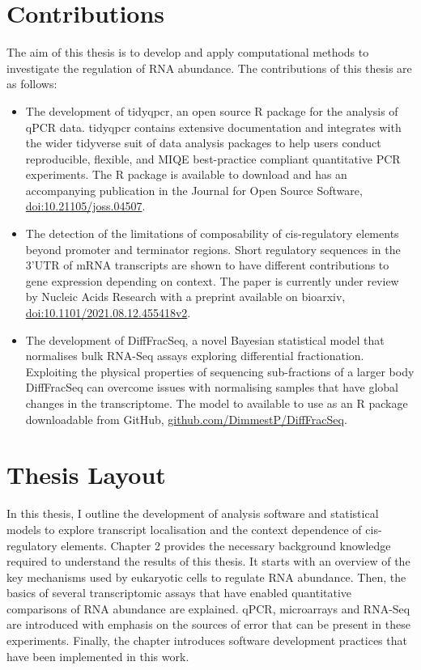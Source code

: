 \documentclass[../main.tex]{subfiles}
\begin{document}
\section{Contributions}
The aim of this thesis is to develop and apply computational methods to investigate the regulation of RNA abundance.
The contributions of this thesis are as follows:

\begin{itemize}
    \item The development of tidyqpcr, an open source R package for the analysis of qPCR data. 
    tidyqpcr contains extensive documentation and integrates with the wider tidyverse suit of data analysis packages to help users conduct reproducible, flexible, and MIQE best-practice compliant quantitative PCR experiments.
    The R package is available to download and has an accompanying publication in the Journal for Open Source Software, \href{https://joss.theoj.org/papers/10.21105/joss.04507}{doi:10.21105/joss.04507}.
    \item  The detection of the limitations of composability of cis-regulatory elements beyond promoter and terminator regions.
    Short regulatory sequences in the 3'UTR of mRNA transcripts are shown to have different contributions to gene expression depending on context.
    The paper is currently under review by Nucleic Acids Research with a preprint available on bioarxiv, \href{https://www.biorxiv.org/content/10.1101/2021.08.12.455418v2}{doi:10.1101/2021.08.12.455418v2}.
    \item The development of DiffFracSeq, a novel Bayesian statistical model that normalises bulk RNA-Seq assays exploring differential fractionation. 
    Exploiting the physical properties of sequencing sub-fractions of a larger body DiffFracSeq can overcome issues with normalising samples that have global changes in the transcriptome.
    The model to available to use as an R package downloadable from GitHub, \href{https://github.com/DimmestP/DiffFracSeq}{github.com/DimmestP/DiffFracSeq}.
\end{itemize}

\section{Thesis Layout}

In this thesis, I outline the development of analysis software and statistical models to explore transcript localisation and the context dependence of cis-regulatory elements.
Chapter 2 provides the necessary background knowledge required to understand the results of this thesis.
It starts with an overview of the key mechanisms used by eukaryotic cells to regulate RNA abundance. 
Then, the basics of several transcriptomic assays that have enabled quantitative comparisons of RNA abundance are explained. 
qPCR, microarrays and RNA-Seq are introduced with emphasis on the sources of error that can be present in these experiments. 
Finally, the chapter introduces software development practices that have been implemented in this work. 
\end{document}
